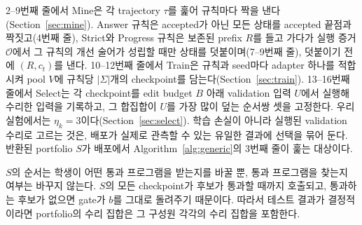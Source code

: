 \documentclass[10pt,conference]{IEEEtran}
\begin{document}
2--9번째 줄에서 Mine은 각 trajectory \(\tau\)를 훑어 규칙마다 짝을 낸다(Section~\ref{sec:mine}). Answer 규칙은 accepted가 아닌 모든 상태를 accepted 끝점과 짝짓고(4번째 줄), Strict와 Progress 규칙은 보존된 prefix \(R\)를 들고 가다가 실행 증거 \(\mathcal O\)에서 그 규칙의 개선 술어가 성립할 때만 상태를 덧붙이며(7--9번째 줄), 덧붙이기 전에 \((R,c_t)\)를 낸다. 10--12번째 줄에서 Train은 규칙과 seed마다 adapter 하나를 적합시켜 pool \(V\)에 규칙당 \(|\Sigma|\)개의 checkpoint를 담는다(Section~\ref{sec:train}). 13--16번째 줄에서 Select는 각 checkpoint를 edit budget \(B\) 아래 validation 입력 \(U\)에서 실행해 수리한 입력을 기록하고, 그 합집합이 \(U\)를 가장 많이 덮는 순서쌍 셋을 고정한다. 우리 실험에서는 \(\eta_k=3\)이다(Section~\ref{sec:select}). 학습 손실이 아니라 실행된 validation 수리로 고르는 것은, 배포가 실제로 관측할 수 있는 유일한 결과에 선택을 묶어 둔다. 반환된 portfolio \(S\)가 배포에서 Algorithm~\ref{alg:generic}의 3번째 줄이 훑는 대상이다.

\(S\)의 순서는 학생이 어떤 통과 프로그램을 받는지를 바꿀 뿐, 통과 프로그램을 찾는지 여부는 바꾸지 않는다. \(S\)의 모든 checkpoint가 후보가 통과할 때까지 호출되고, 통과하는 후보가 없으면 gate가 \(b\)를 그대로 돌려주기 때문이다. 따라서 테스트 결과가 결정적이라면 portfolio의 수리 집합은 그 구성원 각각의 수리 집합을 포함한다.
\end{document}
